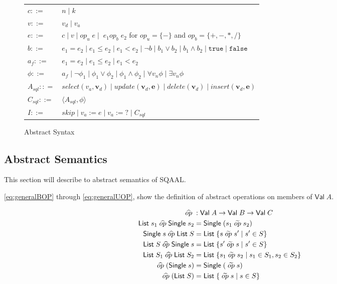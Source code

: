 \begin{figure}[htb!]
    \center
    \begin{tabular}{l l}
        $c ::=$ & $n \mid k$ \\
        $v ::=$ & $v_d \mid v_a$ \\
        $e ::=$ & $c \mid v \mid op_u\; e \mid \;e_1 op_b\; e_2$ for $op_u = \{-\}$ and $op_b = \{+, -, *, / \}$ \\

        $b ::=$ & $e_1 = e_2 \mid e_1 \leq e_2 \mid e_1 < e_2 \mid \neg b \mid b_1 \lor b_2 \mid b_1 \land b_2 \mid \texttt{true} \mid \texttt{false}$ \\

        $a_f ::=$ & $e_1 = e_2 \mid e_1 \leq e_2 \mid e_1 < e_2$ \\
        $\phi ::=$ & $a_f \mid \neg \phi_1 \mid \phi_1 \lor \phi_2 \mid \phi_1 \land \phi_2 \mid \forall v_n \phi \mid \exists v_n \phi$ \\
        $A_{sql} :: =$ & $select(v_a, \mathbf{v}_d) \mid update(\mathbf{v}_d, \mathbf{e}) \mid delete(\mathbf{v}_d) \mid insert(\mathbf{v}_d, \mathbf{e})$ \\
        $C_{sql} ::=$ & $\langle A_{sql}, \phi \rangle $ \\
        $I ::=$ & $skip \mid v_a := e \mid v_a := ? \mid C_{sql} $\\
    \end{tabular}
    \caption{Abstract Syntax}
    \label{tab:abstract-syntax}
\end{figure}


\subsection{Abstract Semantics}\label{subsec:abstract-semantics}
This section will describe to abstract semantics of SQAAL.

\autoref{eq:generalBOP} through \ref{eq:generalUOP}, show the definition of abstract operations on members of $\mathsf{Val} \; A$.

\begin{align}
    \aop &: \mathsf{Val} \; A \rightarrow \mathsf{Val} \; B \rightarrow \mathsf{Val} \; C \\
    \mathsf{List} \; s_1 \aop \mathsf{Single} \; s_2 &= \mathsf{Single} \; (s_1 \aaop s_2) \label{eq:generalBOP} \\
    \mathsf{Single} \; s \aop \mathsf{List} \; S &= \mathsf{List} \; \{ s \aaop s' \mid s' \in S \} \\
    \mathsf{List} \; S \aop \mathsf{Single} \; s &= \mathsf{List} \; \{ s' \aaop s \mid s' \in S \}  \\
    \mathsf{List} \; S_1 \aop \mathsf{List} \; S_2 &= \mathsf{List} \; \{ s_1 \aaop s_2 \mid s_1 \in S_1, s_2 \in S_2 \} \\
    \aop (\mathsf{Single} \; s) &= \mathsf{Single} \; (\aaop s) \\
    \aop (\mathsf{List} \; S) &= \mathsf{List} \; \{ \aaop s \mid s \in S \} \label{eq:generalUOP}
\end{align}


